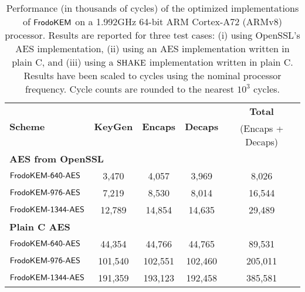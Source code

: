 \documentclass{iacrcc}
\begin{document}
\begin{table}[t]
\caption{Performance (in thousands of cycles) of the optimized implementations of $\textsf{\upshape\mdseries FrodoKEM}$ on a 1.992GHz 64-bit ARM Cortex-A72 (ARMv8) processor. Results are reported for three test cases: (i) using OpenSSL's AES implementation, (ii) using an AES implementation written in plain C, and (iii) using a $\textrm{\upshape\mdseries SHAKE}$ implementation written in plain C. Results have been scaled to cycles using the nominal processor frequency. Cycle counts are rounded to the nearest $10^3$ cycles.}\label{tab:results_arm}
\medskip
\centering
\renewcommand{\tabcolsep}{0.25cm}
\renewcommand{\arraystretch}{1.1}
\begin{tabular}{l|c c c|c}
\toprule
\multirow{2}{*}{\textbf{Scheme}}     &     \multirow{2}{*}{\textbf{KeyGen}}      &    \multirow{2}{*}{\textbf{Encaps}}   &    \multirow{2}{*}{\textbf{Decaps}}   &    \textbf{Total}        \\ 
                                                       &                                                            &                                                         &                                                       &    (Encaps + Decaps)   \\
\midrule
\multicolumn{5}{l}{\bf AES from OpenSSL} \\
\midrule
$\textsf{\upshape\mdseries FrodoKEM-640-AES}$                               &            3,470                &            4,057                   &                 3,969         &                8,026             \\
$\textsf{\upshape\mdseries FrodoKEM-976-AES}$                             &            7,219                &            8,530                   &                8,014       &                16,544             \\
$\textsf{\upshape\mdseries FrodoKEM-1344-AES}$                             &            12,789                &            14,854                   &                14,635       &                29,489             \\
\midrule
\multicolumn{5}{l}{\bf Plain C AES} \\
\midrule
$\textsf{\upshape\mdseries FrodoKEM-640-AES}$                               &            44,354                &           44,766                   &               44,765       &              89,531             \\
$\textsf{\upshape\mdseries FrodoKEM-976-AES}$                             &         101,540                &         102,551                   &             102,460       &               205,011             \\
$\textsf{\upshape\mdseries FrodoKEM-1344-AES}$                             &            191,359                &           193,123                   &                192,458       &               385,581             \\

\end{tabular}
\end{table}
\end{document}
